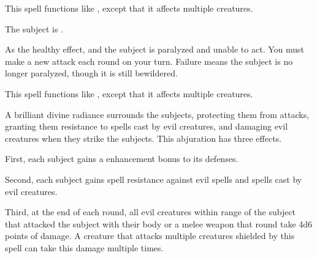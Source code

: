 \begin{spelleffect}
  This spell functions like , except that it affects multiple creatures.
\end{spelleffect}

\spellrng{\rngclose}
\begin{spellhealthy}
  The subject is \bewildered.
\end{spellhealthy}
\begin{spellblood}
  As the healthy effect, and the subject is paralyzed and unable to act. You must make a new attack each round on your turn. Failure means the subject is no longer paralyzed, though it is still bewildered.
\end{spellblood}

\spellrng{\rngmed}
\begin{spelleffect}
  This spell functions like , except that it affects multiple creatures.
\end{spelleffect}

\begin{spelleffect}
  A brilliant divine radiance surrounds the subjects, protecting them from attacks, granting them resistance to spells cast by evil creatures, and damaging evil creatures when they strike the subjects. This abjuration has three effects.
  \par First, each subject gains a  enhancement bonus to its defenses.
  \par Second, each subject gains spell resistance against evil spells and spells cast by evil creatures.
  \par Third, at the end of each round, all evil creatures within \rngclose range of the subject that attacked the subject with their body or a melee weapon that round take 4d6 points of damage. A creature that attacks multiple creatures shielded by this spell can take this damage multiple times.
\end{spelleffect}

